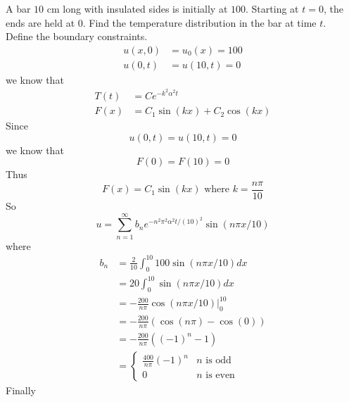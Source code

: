 \item [2.] A bar $10$ cm long with insulated sides is initially at $100$\textdegree . Starting at $t = 0$, the ends are held at $0$\textdegree. Find the temperature distribution in the bar at time $t$.\\[2mm]
Define the boundary constraints.
\begin{align*}
    u(x,0) &=u_0(x) = 100\\
    u(0,t) &=u(10,t) =0
\end{align*}
we know that 
\begin{align*}
    T(t) &= Ce^{-k^2\alpha^2t}\\
    F(x) &= C_1\sin(kx)+C_2\cos(kx)
\end{align*}
Since 
\[
    u(0,t) =u(10,t) =0
\]
we know that 
\[
    F(0)=F(10)=0
\]
Thus
\[
F(x) = C_1\sin(kx) \text{ where }k=\frac{n\pi}{10}
\]
So
\[
    u=\sum_{n=1}^{\infty}b_ne^{-n^2\pi^2\alpha^2t/(10)^2}\sin(n\pi x/10)
\]
where
\begin{align*}
    b_n 
    &= \frac{2}{10}\int_0^{10}100\sin(n \pi x / 10)dx\\
    &= 20\int_0^{10}\sin(n \pi x / 10)dx\\
    &= -\frac{200}{n \pi} \cos(n \pi x / 10)\Big|_0^{10}\\
    &= -\frac{200}{n \pi} (\cos(n \pi) -\cos(0))\\
    &= -\frac{200}{n \pi} ((-1)^n-1)\\
    &=
    \begin{cases}
        \frac{400}{n \pi} (-1)^n & n\text{ is odd}\\
        0 & n\text{ is even}
    \end{cases}
\end{align*}
Finally
\answer{\[
    u = \frac{400}{\pi}\sum_{\substack{n = 1 \\ \text{odd } n}}^{\infty}\frac{1}{n}e^{-n^2\pi^2\alpha^2t/(10)^2}\sin(n\pi x/10)
\]}